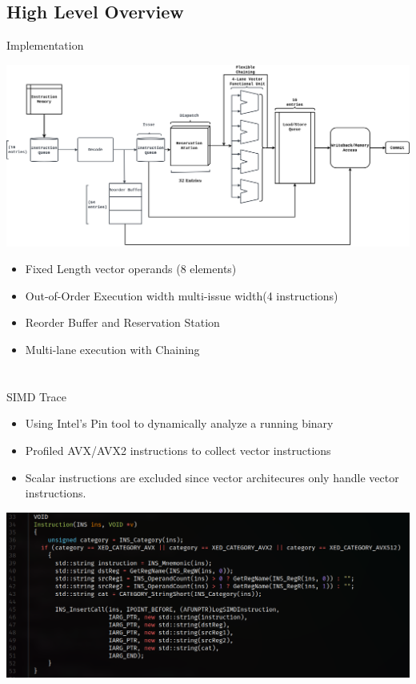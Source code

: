 \documentclass{beamer}
\begin{document}
\subsection{High Level Overview}
\begin{frame}{Implementation}
    \begin{center}
    \includegraphics[scale=.135]{../abstract/diagram.png}
    \end{center}
    \begin{itemize}
        \item Fixed Length vector operands (8 elements)
        \item Out-of-Order Execution width multi-issue width(4 instructions)
        \item Reorder Buffer and Reservation Station
        \item Multi-lane execution with Chaining
    \end{itemize}
\end{frame}

\section{}
\begin{frame}{SIMD Trace}
    \begin{itemize}
        \item Using Intel's Pin tool to dynamically analyze a running binary
        \item Profiled AVX/AVX2 instructions to collect vector
            instructions
        \item Scalar instructions are excluded since vector architecures only handle
            vector instructions.
    \end{itemize}
    \includegraphics[scale=.3]{pin_snip.png}
\end{frame}
\end{document}
